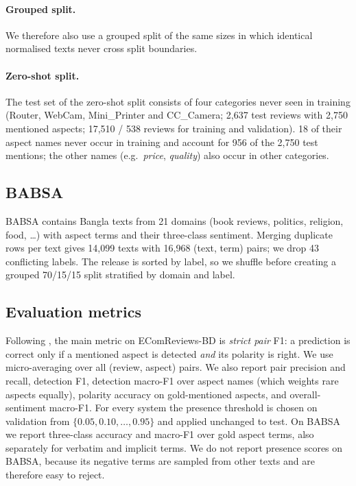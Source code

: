 \documentclass[11pt]{article}
\begin{document}
\paragraph{Grouped split.} We therefore also use a grouped split of the same sizes in which identical
normalised texts never cross split boundaries.

\paragraph{Zero-shot split.} The test set of the zero-shot split consists of four categories never
seen in training (Router, WebCam, Mini\_Printer and CC\_Camera; 2,637 test reviews with 2,750 mentioned
aspects; 17,510 / 538 reviews for training and validation). 18 of their aspect names never occur in
training and account for 956 of the 2,750 test mentions; the other names (e.g.\ \textit{price},
\textit{quality}) also occur in other categories.

\subsection{BABSA}
BABSA \citep{rohman2025babsa} contains Bangla texts from 21 domains (book reviews, politics, religion,
food, \dots) with aspect terms and their three-class sentiment. Merging duplicate rows per text gives
14,099 texts with 16,968 (text, term) pairs; we drop 43 conflicting labels. The release is sorted by
label, so we shuffle before creating a grouped 70/15/15 split stratified by domain and label.

\subsection{Evaluation metrics}
Following \citet{haque2026ecomreviews}, the main metric on EComReviews-BD is \emph{strict pair} F1: a
prediction is correct only if a mentioned aspect is detected \emph{and} its polarity is right. We use
micro-averaging over all (review, aspect) pairs. We also report pair precision and recall, detection
F1, detection macro-F1 over aspect names (which weights rare aspects equally), polarity accuracy on
gold-mentioned aspects, and overall-sentiment macro-F1. For every system the presence threshold is
chosen on validation from $\{0.05,0.10,\dots,0.95\}$ and applied unchanged to test. On BABSA we report
three-class accuracy and macro-F1 over gold aspect terms, also separately for verbatim and implicit
terms. We do not report presence scores on BABSA, because its negative terms are sampled from other
texts and are therefore easy to reject.
\end{document}
